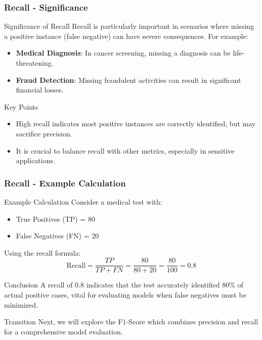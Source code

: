 \documentclass[aspectratio=169]{beamer}
\begin{document}
\begin{frame}[fragile]
    \frametitle{Recall - Significance}
    
    \begin{block}{Significance of Recall}
        Recall is particularly important in scenarios where missing a positive instance (false negative) can have severe consequences. For example:
    \end{block}
    
    \begin{itemize}
        \item \textbf{Medical Diagnosis}: In cancer screening, missing a diagnosis can be life-threatening.
        \item \textbf{Fraud Detection}: Missing fraudulent activities can result in significant financial losses.
    \end{itemize}
    
    \begin{block}{Key Points}
        \begin{itemize}
            \item High recall indicates most positive instances are correctly identified, but may sacrifice precision.
            \item It is crucial to balance recall with other metrics, especially in sensitive applications.
        \end{itemize}
    \end{block}
\end{frame}

\begin{frame}[fragile]
    \frametitle{Recall - Example Calculation}
    
    \begin{block}{Example Calculation}
        Consider a medical test with:
        \begin{itemize}
            \item True Positives (TP) = 80
            \item False Negatives (FN) = 20
        \end{itemize}
        
        Using the recall formula:
        \begin{equation}
        \text{Recall} = \frac{TP}{TP + FN} = \frac{80}{80 + 20} = \frac{80}{100} = 0.8
        \end{equation}
    \end{block}
    
    \begin{block}{Conclusion}
        A recall of 0.8 indicates that the test accurately identified 80\% of actual positive cases, vital for evaluating models when false negatives must be minimized.
    \end{block}
    
    \begin{block}{Transition}
        Next, we will explore the F1-Score which combines precision and recall for a comprehensive model evaluation.
    \end{block}
\end{frame}
\end{document}

